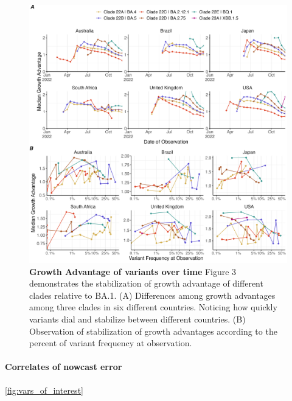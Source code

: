 \documentclass[11pt,oneside,letterpaper]{article}
\begin{document}
\begin{figure}[H]
	\centering
    \includegraphics[width=1.1\textwidth]{figures/ga_estimates.png}
	\caption{\textbf{Growth Advantage of variants over time}
	Figure 3 demonstrates the stabilization of growth advantage of different clades relative to BA.1.
	(A) Differences among growth advantages among three clades in six different countries. 
	Noticing how quickly variants dial and stabilize between different countries.
	(B) Observation of stabilization of growth advantages according to the percent of variant frequency at observation.
	}
	\label{fig:ga_estimates}
\end{figure}

\paragraph{Correlates of nowcast error}%

\ref{fig:vars_of_interest}
\end{document}

